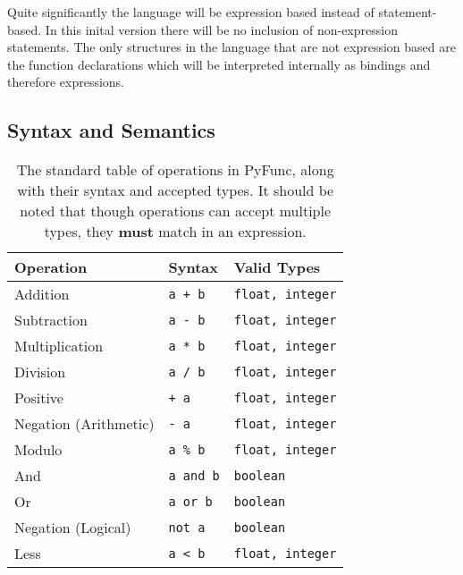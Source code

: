 \documentclass{l4proj}
\begin{document}
Quite significantly the language will be expression based instead of statement-based.
In this inital version there will be no inclusion of non-expression statements.
The only structures in the language that are not expression based are the function declarations which will be interpreted internally as bindings and therefore expressions.


\clearpage
\subsection{Syntax and Semantics}

\begin{table}[h!]
    \caption{The standard table of operations in PyFunc, along with their syntax and accepted types. It should be noted that though operations can accept multiple types, they \textbf{must} match in an expression.}\label{tab:operators}
    \begin{center}
    \begin{tabular}{@{}|l|l|l|@{}}
    \hline
    \textbf{Operation}    & \textbf{Syntax}       &   \textbf{Valid Types}    \\ %
    \hline
    Addition              & \texttt{a + b}        &   \texttt{float, integer} \\
    Subtraction           & \texttt{a - b}        &   \texttt{float, integer} \\
    Multiplication        & \texttt{a * b}        &   \texttt{float, integer} \\
    Division              & \texttt{a / b}        &   \texttt{float, integer} \\
    Positive              & \texttt{+ a}          &   \texttt{float, integer} \\
    Negation (Arithmetic) & \texttt{- a}          &   \texttt{float, integer} \\
    Modulo                & \texttt{a \% b}       &   \texttt{float, integer} \\
    And                   & \texttt{a and b}      &   \texttt{boolean}        \\
    Or                    & \texttt{a or b}       &   \texttt{boolean}        \\
    Negation (Logical)    & \texttt{not a}        &   \texttt{boolean}        \\
    Less                  & \texttt{a < b}        &   \texttt{float, integer} \\

\end{tabular}
\end{center}
\end{table}
\end{document}
